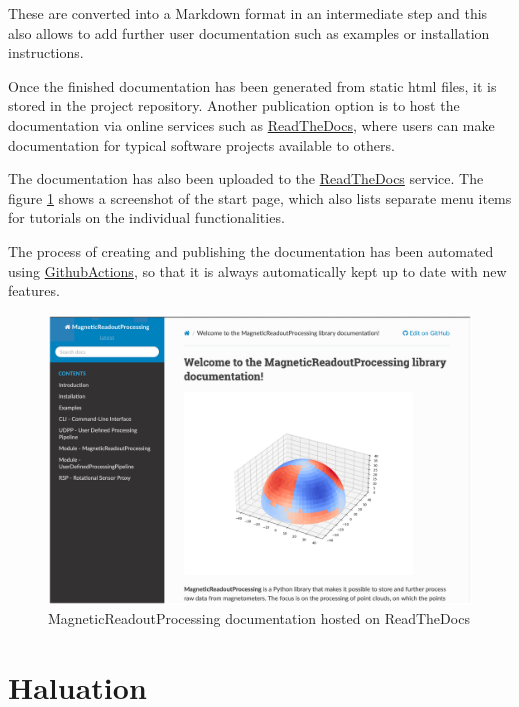 These are converted into a Markdown format in an intermediate step and
this also allows to add further user documentation such as examples or
installation instructions.

Once the finished documentation has been generated from static
\gls{html} files, it is stored in the project repository. Another
publication option is to host the documentation via online services such
as \href{https://readthedocs.com}{ReadTheDocs}, where users can make
documentation for typical software projects available to others.

The documentation has also been uploaded to the
\href{https://magneticreadoutprocessing.readthedocs.io/}{ReadTheDocs}
service. The figure
\ref{MagneticReadoutProcessing_documentation_hosted_on_ReadTheDocs.png}
shows a screenshot of the start page, which also lists separate menu
items for tutorials on the individual functionalities.

The process of creating and publishing the documentation has been
automated using
\href{https://github.com/features/actions}{GithubActions}, so that it is
always automatically kept up to date with new features.

\begin{figure}
\centering
\includegraphics{./generated_images/border_MagneticReadoutProcessing_documentation_hosted_on_ReadTheDocs.png}
\caption{MagneticReadoutProcessing documentation hosted on ReadTheDocs
\label{MagneticReadoutProcessing_documentation_hosted_on_ReadTheDocs.png}}
\end{figure}

\hypertarget{haluation}{%
\chapter{Haluation}\label{haluation}}

